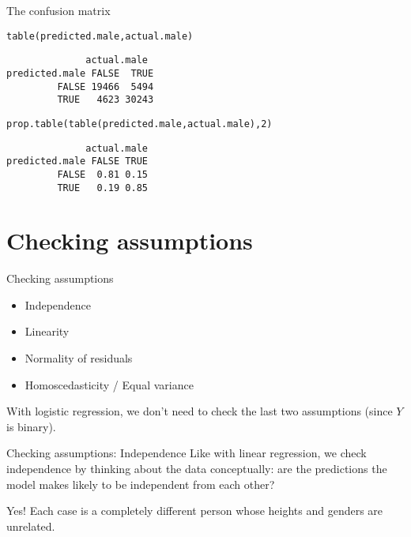 \documentclass{beamer}\usepackage[]{graphicx}\usepackage[]{color}
\makeatletter
\newcommand{\hlnum}[1]{\textcolor[rgb]{0.824,0.412,0.118}{#1}}%
\newcommand{\hlstd}[1]{\textcolor[rgb]{1,0.894,0.769}{#1}}%
\newcommand{\hlkwd}[1]{\textcolor[rgb]{1,0.78,0.769}{#1}}%
\newenvironment{kframe}{%
 \def\at@end@of@kframe{}%
 \ifinner\ifhmode%
  \def\at@end@of@kframe{\end{minipage}}%
  \begin{minipage}{\columnwidth}%
 \fi\fi%
 \def\FrameCommand##1{\hskip\@totalleftmargin \hskip-\fboxsep
 \colorbox{shadecolor}{##1}\hskip-\fboxsep
     \hskip-\linewidth \hskip-\@totalleftmargin \hskip\columnwidth}%
 \MakeFramed {\advance\hsize-\width
   \@totalleftmargin\z@ \linewidth\hsize
   \@setminipage}}%
 {\par\unskip\endMakeFramed%
 \at@end@of@kframe}
\newenvironment{knitrout}{}{} %
\makeatother
\begin{document}
\begin{darkframes}
    \begin{frame}[fragile]{The confusion matrix}
\begin{knitrout}
\begin{kframe}
\begin{alltt}
\hlkwd{table}\hlstd{(predicted.male, actual.male)}
\end{alltt}
\begin{verbatim}
              actual.male
predicted.male FALSE  TRUE
         FALSE 19466  5494
         TRUE   4623 30243
\end{verbatim}
\begin{alltt}
\hlkwd{prop.table}\hlstd{(}\hlkwd{table}\hlstd{(predicted.male, actual.male),} \hlnum{2}\hlstd{)}
\end{alltt}
\begin{verbatim}
              actual.male
predicted.male FALSE TRUE
         FALSE  0.81 0.15
         TRUE   0.19 0.85
\end{verbatim}
\end{kframe}
\end{knitrout}
    \end{frame}

    \section{Checking assumptions}

    \begin{frame}{Checking assumptions}
      \begin{itemize}
        \item Independence
        \item Linearity
        \item Normality of residuals \redx
        \item Homoscedasticity / Equal variance \redx
      \end{itemize}
      With logistic regression, we don't need to check the last two assumptions (since $Y$ is binary).
    \end{frame}

    \begin{frame}{Checking assumptions: Independence}
      Like with linear regression, we check independence by thinking about the data conceptually: are the predictions the model makes likely to be independent from each other?
      \bigskip\pause

      \greencheckmark \alert{Yes!} Each case is a completely different person whose heights and genders are unrelated.
    \end{frame}


\end{darkframes}
\end{document}
